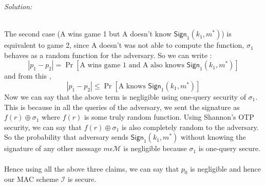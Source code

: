 \documentclass[a4paper, 11pt]{article}
\newenvironment{solution}
    {\textit{Solution:}}
    {\clearpage}
\newcommand{\sign}{\mathsf{Sign}}
\newcommand{\calI}{\mathcal{I}}
\newcommand{\calM}{\mathcal{M}}
\begin{document}
\begin{solution}
\begin{enumerate}[(a)]
              \\
              The second case (A wins game 1 but A doesn't know $\sign_1(k_1, m^*)$) is equivalent to game 2, since A doesn't was not able to compute the function, $\sigma_1$ behaves as a random function for the adversary. So we can write :
              $$|p_1 - p_2| = \Pr[\text{A wins game 1 and A also knows $\sign_1(k_1, m^*)$}]$$ and from this ,
              $$|p_1 - p_2| \leq \Pr[\text{A knows }\sign_1(k_1, m^*)]$$
              Now we can say that the above term is negligible using one-query security of $\sigma_1$. This is because in all the queries of the adversary, we sent the signature as $f(r) \oplus \sigma_1$ where $f(r)$ is some truly random function. Using Shannon's OTP security, we can say that $f(r) \oplus \sigma_1$ is also completely random to the adversary. So the probability that adversary sends $\sign_1(k_1, m^*)$ without knowing the signature of any other message $m \epsilon \calM$ is negligible because $\sigma_1$ is one-query secure. \\ \\
              Hence using all the above three claims, we can say that $p_0$ is negligible and hence our MAC scheme $\calI$ is secure.

    \end{enumerate}
\end{solution}
\end{document}
